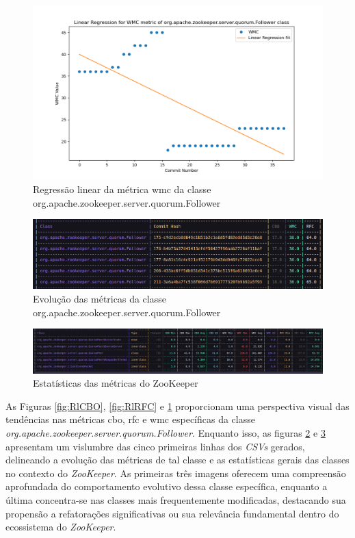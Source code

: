 \begin{figure}[h]
    \centering
    \includegraphics[width=0.8\linewidth]{figuras/Output/Metrics_Predictions/WMC.png}
    \caption{Regressão linear da métrica \gls{wmc} da classe org.apache.zookeeper.server.quorum.Follower}
    \label{fig:RlWMC}
\end{figure}

\begin{figure}[h]
    \centering
    \includegraphics[width=0.8\linewidth]{figuras/Output/Metrics_Evolution/Metrics_Evolution.png}
    \caption{Evolução das métricas da classe org.apache.zookeeper.server.quorum.Follower}
    \label{fig:EvolutionFollowerClass}
\end{figure}

\begin{figure}[h]
    \centering
    \includegraphics[width=0.8\linewidth]{figuras/Output/Metrics_Statistics/Metrics_Statistics.png}
    \caption{Estatísticas das métricas do ZooKeeper}
    \label{fig:StatisticsFollowerClass}
\end{figure}

As Figuras \ref{fig:RlCBO}, \ref{fig:RlRFC} e \ref{fig:RlWMC} proporcionam uma perspectiva visual das tendências nas métricas \gls{cbo}, \gls{rfc} e \gls{wmc} específicas da classe \textit{org.apache.zookeeper.server.quorum.Follower}. Enquanto isso, as figuras \ref{fig:EvolutionFollowerClass} e \ref{fig:StatisticsFollowerClass} apresentam um vislumbre das cinco primeiras linhas dos \textit{CSVs} gerados, delineando a evolução das métricas de tal classe e as estatísticas gerais das classes no contexto do \textit{ZooKeeper}. As primeiras três imagens oferecem uma compreensão aprofundada do comportamento evolutivo dessa classe específica, enquanto a última concentra-se nas classes mais frequentemente modificadas, destacando sua propensão a refatorações significativas ou sua relevância fundamental dentro do ecossistema do \textit{ZooKeeper}.

